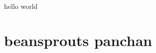 \documentclass[a4paper,12pt]{article}
\begin{document}
hello world
\clearpage
\section{beansprouts panchan}
\end{document}
